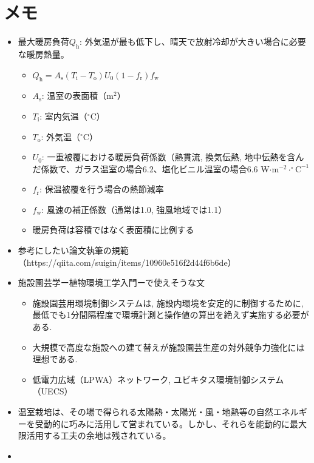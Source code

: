 \documentclass[uplatex,dvipdfmx,nomag,a4paper,oneside,onecolumn,12pt]{bxjsreport} %
\begin{document}
\chapter{メモ}
\begin{itemize}
    \item 最大暖房負荷\(Q_\text{h}\): 外気温が最も低下し、晴天で放射冷却が大きい場合に必要な暖房熱量\cite{Samejima2021}。
    \begin{itemize}
        \item \(Q_\text{h} = A_\text{s} (T_\text{i} - T_\text{o}) U_\text{0} (1 - f_\text{r}) f_\text{w}\)
        \item \(A_\text{s}\): 温室の表面積（m\(^2\)）
        \item \(T_\text{i}\): 室内気温（\(^\circ \text{C}\)）
        \item \(T_\text{o}\): 外気温（\(^\circ \text{C}\)）
        \item \(U_\text{0}\): 一重被覆における暖房負荷係数（熱貫流, 換気伝熱, 地中伝熱を含んだ係数で、ガラス温室の場合6.2、塩化ビニル温室の場合6.6 W\(\cdot\)m\(^{-2}\cdot ^\circ \text{C}^{-1}\)
        \item \(f_\text{r}\): 保温被覆を行う場合の熱節減率
        \item \(f_\text{w}\): 風速の補正係数（通常は1.0,  強風地域では1.1）
        \item 暖房負荷は容積ではなく表面積に比例する
    \end{itemize}
    \item 参考にしたい論文執筆の規範（https://qiita.com/suigin/items/10960e516f2d44f6b6de）
    \item 施設園芸学ー植物環境工学入門ーで使えそうな文\cite{Goto2022}
    \begin{itemize}
        \item 施設園芸用環境制御システムは, 施設内環境を安定的に制御するために, 最低でも1分間隔程度で環境計測と操作値の算出を絶えず実施する必要がある. 
        \item 大規模で高度な施設への建て替えが施設園芸生産の対外競争力強化には理想である. 
        \item 低電力広域（LPWA）ネットワーク, ユビキタス環境制御システム（UECS）
    \end{itemize}
    \item 温室栽培は、その場で得られる太陽熱・太陽光・風・地熱等の自然エネルギーを受動的に巧みに活用して営まれている。しかし、それらを能動的に最大限活用する工夫の余地は残されている\cite{Tanino2018}。
    \item 
\end{itemize}

\backmatter







\end{document}
